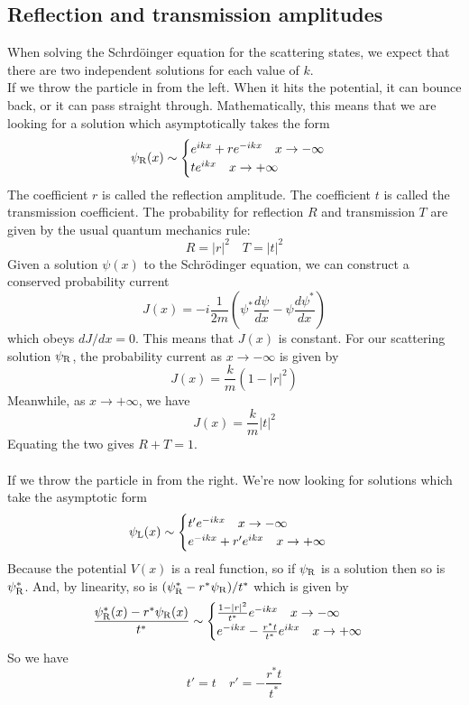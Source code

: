\subsection{Reflection and transmission amplitudes}
When solving the Schrd\"{o}inger equation for the scattering states, we expect that there are two independent solutions for each value of $k$.
\\
If we throw the particle in from the left. When it hits the potential, it can bounce back, or it can pass straight through. 
Mathematically, this means that we are looking for a solution which asymptotically takes the form
\[\psi_{\rm R}(x) \sim \begin{cases} e^{ikx} + re^{-ikx} \quad x \to -\infty \\ te^{ikx} \quad x \to +\infty \end{cases}\]
The coefficient $r$ is called the reflection amplitude. The coefficient $t$ is called the transmission coefficient. The probability for reflection $R$ and transmission $T$ are given by the usual quantum mechanics rule:
\[R = |r|^2 \quad T = |t|^2\]
Given a solution $\psi(x)$ to the Schr\"{o}dinger equation, we can construct a conserved probability current
\[J(x) = -i\frac{1}{2m}\left( \psi^*\frac{d\psi}{dx} - \psi\frac{d\psi^*}{dx}\right)\]
which obeys $dJ/dx = 0$. This means that $J(x)$ is constant. For our scattering solution $\psi_{\rm R}$, the probability current as $x\to-\infty$ is given by
\[J(x) = \frac{k}{m}(1-|r|^2)\]
Meanwhile, as $x \to +\infty$, we have
\[J(x) = \frac{k}{m} |t|^2\]
Equating the two gives $R + T =1$.
\\ \\
If we throw the particle in from the right. We're now looking for solutions which take the asymptotic form
\[\psi_{\rm L}(x) \sim \begin{cases} t'e^{-ikx}  \quad x \to -\infty \\ e^{-ikx} + r'e^{ikx} \quad x \to +\infty \end{cases}\]
Because the potential $V (x) $ is a real function, so if $\psi_{\rm R}$ is a solution then so is $\psi^*_{\rm R}$. And, by linearity, so is $(\psi^*_{\rm R} - r^*\psi_{\rm R}) / t^* $ which is given by
\[\frac{\psi^*_{\rm R}(x) - r^*\psi_{\rm R}(x)}{t^*} \sim \begin{cases} \frac{1-|r|^2}{t^*} e^{-ikx}  \quad x \to -\infty \\ e^{-ikx} - \frac{r^* t}{t^*}e^{ikx} \quad x \to +\infty \end{cases}\]
So we have
\[t' = t \quad r' = -\frac{r^* t}{t^*}\]

